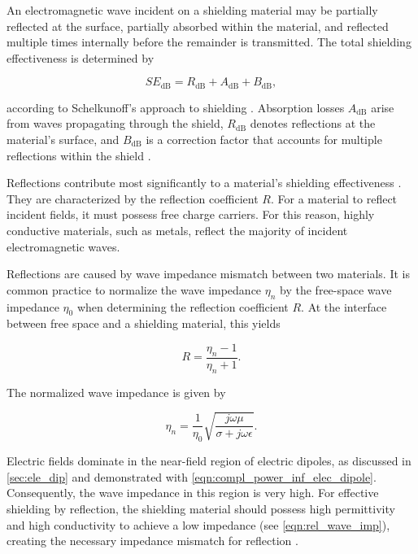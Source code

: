 An electromagnetic wave incident on a shielding material may be partially reflected at the surface, partially absorbed within the material, and reflected multiple times internally before the remainder is transmitted. The total shielding effectiveness is determined by \cite[p.~63]{Jaroszewski_Thomas_Rane_2019}

\begin{equation}
	SE_{\mathrm{dB}}=R_{\mathrm{dB}}+A_{\mathrm{dB}}+B_{\mathrm{dB}},
	\label{eqn:se_rereflections}
\end{equation}


according to Schelkunoff's approach to shielding \cite{Schelkunoff_1938}. Absorption losses $A_{\mathrm{dB}}$ arise from waves propagating through the shield, $R_{\mathrm{dB}}$ denotes reflections at the material’s surface, and $B_{\mathrm{dB}}$ is a correction factor that accounts for multiple reflections within the shield \cite{10518640}.

Reflections contribute most significantly to a material’s shielding effectiveness \cite[p.~1]{Jaroszewski_Thomas_Rane_2019}. They are characterized by the reflection coefficient $R$. For a material to reflect incident fields, it must possess free charge carriers. For this reason, highly conductive materials, such as metals, reflect the majority of incident electromagnetic waves.

Reflections are caused by wave impedance mismatch between two materials. It is common practice to normalize the wave impedance $\eta_n$ by the free-space wave impedance $\eta_0$ when determining the reflection coefficient $R$. At the interface between free space and a shielding material, this yields \cite[p.~183]{Collin_2015}

\begin{equation}
	R=\frac{\eta_n-1}{\eta_n+1}.
	\label{eqn:reflection_coefficient_plane_dielectric}
\end{equation}

The normalized wave impedance is given by

\begin{equation}
\eta_n=\frac{1}{\eta_0}\sqrt{\frac{j\omega\mu}{\sigma+j\omega\epsilon}}.
\label{eqn:rel_wave_imp}
\end{equation}

Electric fields dominate in the near-field region of electric dipoles, as discussed in \cref{sec:ele_dip} and demonstrated with \eqref{eqn:compl_power_inf_elec_dipole}. Consequently, the wave impedance in this region is very high. For effective shielding by reflection, the shielding material should possess high permittivity and high conductivity to achieve a low impedance (see \autoref{eqn:rel_wave_imp}), creating the necessary impedance mismatch for reflection \cite[p.~67]{Jaroszewski_Thomas_Rane_2019}.


